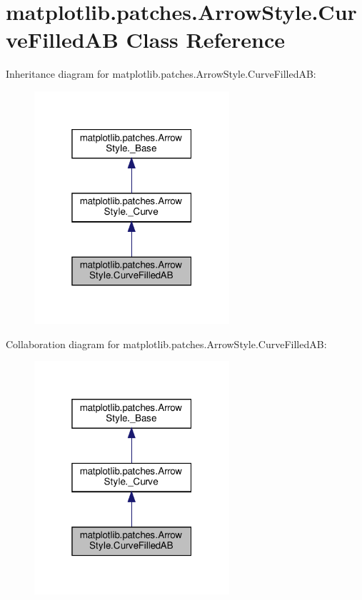 \hypertarget{classmatplotlib_1_1patches_1_1ArrowStyle_1_1CurveFilledAB}{}\section{matplotlib.\+patches.\+Arrow\+Style.\+Curve\+Filled\+AB Class Reference}
\label{classmatplotlib_1_1patches_1_1ArrowStyle_1_1CurveFilledAB}


Inheritance diagram for matplotlib.\+patches.\+Arrow\+Style.\+Curve\+Filled\+AB\+:
\nopagebreak
\begin{figure}[H]
\begin{center}
\leavevmode
\includegraphics[width=205pt]{classmatplotlib_1_1patches_1_1ArrowStyle_1_1CurveFilledAB__inherit__graph}
\end{center}
\end{figure}


Collaboration diagram for matplotlib.\+patches.\+Arrow\+Style.\+Curve\+Filled\+AB\+:
\nopagebreak
\begin{figure}[H]
\begin{center}
\leavevmode
\includegraphics[width=205pt]{classmatplotlib_1_1patches_1_1ArrowStyle_1_1CurveFilledAB__coll__graph}
\end{center}
\end{figure}

